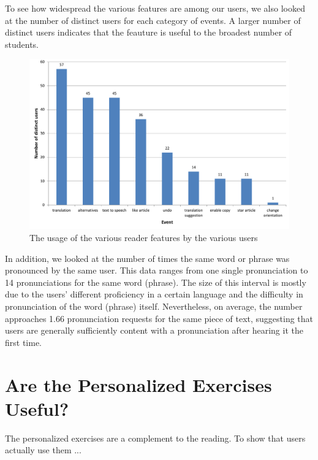 To see how widespread the various features are among our users, we also looked at the number of distinct users for each category of events. A larger number of distinct users indicates that the feauture is useful to the broadest number of students.

\begin{figure}[h!]
\centering
  \includegraphics[width=0.9\columnwidth]{figures/reader_feature_usage_per_user}
  \caption{The usage of the various reader features by the various users }
\end{figure}

In addition, we looked at the number of times the same word or phrase was pronounced by the same user. This data ranges from one single pronunciation to 14 pronunciations for the same word (phrase). The size of this interval is mostly due to the users' different proficiency in a certain language and the difficulty in pronunciation of the word (phrase) itself. Nevertheless, on average, the number approaches 1.66 pronunciation requests for the same
piece of text, suggesting that users are generally sufficiently content with a pronunciation after hearing it the first time.



\section{Are the Personalized Exercises Useful?}

The personalized exercises are a complement to the reading. To show that 
users actually use them ... 

